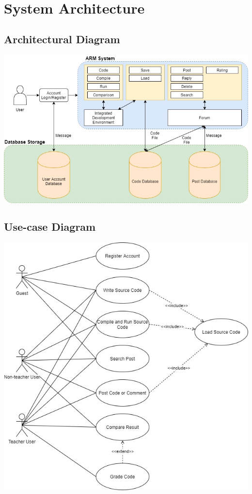 \chapter{System Architecture}
\section{Architectural Diagram}
\includegraphics[scale=0.5]{Doc/Graphics/architectural_diagram}
\newpage
\section{Use-case Diagram}
\includegraphics[scale=0.5]{Doc/Graphics/uml_use_case_2}
